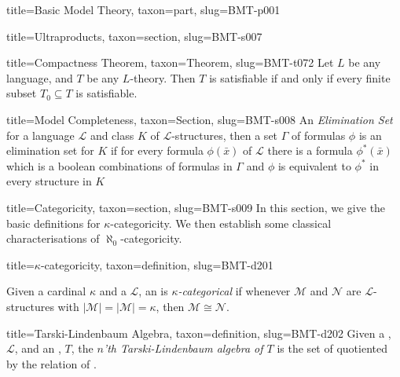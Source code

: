 \documentclass[a4paper]{article}
\begin{document}
\begin{tree}{title={Basic Model Theory}, taxon={part}, slug={BMT-p001}}
\begin{tree}{title={Ultraproducts}, taxon={section}, slug={BMT-s007}}
\begin{tree}{title={Compactness Theorem}, taxon={Theorem}, slug={BMT-t072}}
Let \(L\) be any language, and \(T\) be any \(L\)-theory. Then \(T\) is satisfiable if and only if every finite subset \(T_0 \subseteq  T\) is satisfiable.
\end{tree}

\end{tree}


  
  
\begin{tree}{title={Model Completeness}, taxon={Section}, slug={BMT-s008}}
An \emph{Elimination Set} for a language \(\mathcal {L}\) and class \(K\) of \(\mathcal {L}\)-structures, then a set \(\Gamma\) of formulas \(\phi\) is an elimination set for \(K\) if for every formula \(\phi ( \bar {x})\) of \(\mathcal {L}\) there is a formula \(\phi ^*( \bar {x})\) which is a boolean combinations of formulas in \(\Gamma\) and \(\phi\) is equivalent to \(\phi ^*\) in every structure in \(K\)
\end{tree}


  
  
\begin{tree}{title={Categoricity}, taxon={section}, slug={BMT-s009}}
In this section, we give the basic definitions for \(\kappa\)-categoricity. We then establish some classical characterisations of \(\aleph _0\)-categoricity.
\begin{tree}{title={\(\kappa\)-categoricity}, taxon={definition}, slug={BMT-d201}}

    Given a cardinal \(\kappa\) and a  \(\mathcal {L}\), an  is \emph{\(\kappa\)-categorical} if whenever \(\mathcal {M}\) and \(\mathcal {N}\) are \(\mathcal {L}\)-structures with \(| \mathcal {M}|=| \mathcal {M}|= \kappa\), then \(\mathcal {M}  \cong   \mathcal {N}\). 

\end{tree}

\begin{tree}{title={Tarski-Lindenbaum Algebra}, taxon={definition}, slug={BMT-d202}}
Given a , \(\mathcal {L}\), and an , \(T\), the \emph{\(n\)'th Tarski-Lindenbaum algebra of \(T\)} is the set of  quotiented by the relation of .
\end{tree}


\end{tree}
\end{tree}
\end{document}
